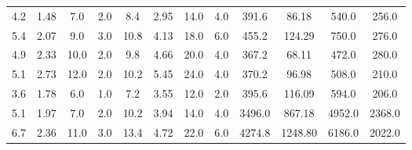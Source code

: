 \documentclass{article}
\begin{document}
\begin{table}[]
\begin{tabular}{cccccccccccc}
	     		4.2                        & 1.48                         & 7.0                      & 2.0                      & 8.4                       & 2.95                         & 14.0                     & 4.0                      & 391.6                     & 86.18                        & 540.0                    & 256.0                    \\
	     		5.4                        & 2.07                         & 9.0                      & 3.0                      & 10.8                      & 4.13                         & 18.0                     & 6.0                      & 455.2                     & 124.29                       & 750.0                    & 276.0                    \\
	     		4.9                        & 2.33                         & 10.0                     & 2.0                      & 9.8                       & 4.66                         & 20.0                     & 4.0                      & 367.2                     & 68.11                        & 472.0                    & 280.0                    \\
	     		5.1                        & 2.73                         & 12.0                     & 2.0                      & 10.2                      & 5.45                         & 24.0                     & 4.0                      & 370.2                     & 96.98                        & 508.0                    & 210.0                    \\
	     		3.6                        & 1.78                         & 6.0                      & 1.0                      & 7.2                       & 3.55                         & 12.0                     & 2.0                      & 395.6                     & 116.09                       & 594.0                    & 206.0                    \\
	     		5.1                        & 1.97                         & 7.0                      & 2.0                      & 10.2                      & 3.94                         & 14.0                     & 4.0                      & 3496.0                    & 867.18                       & 4952.0                   & 2368.0                   \\
	     		6.7                        & 2.36                         & 11.0                     & 3.0                      & 13.4                      & 4.72                         & 22.0                     & 6.0                      & 4274.8                    & 1248.80                      & 6186.0                   & 2022.0                   \\

\end{tabular}
\end{table}
\end{document}
